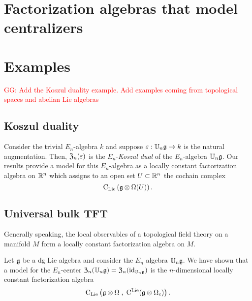 \documentclass[11pt]{amsart}
\numberwithin{equation}{section}
\def\greg{\textcolor{red}{GG: }\textcolor{red}}
\begin{document}
%

\section{Factorization algebras that model centralizers}


\section{Examples}


\greg{Add the Koszul duality example. Add examples coming from topological spaces and abelian Lie algebras}

\subsection{Koszul duality}
\label{sec: Koszul}

Consider the trivial $E_n$-algebra $k$ and suppose $\varepsilon : \mathbb U_n \mathfrak g \to k$ is the natural augmentation. 
Then, ${\frak Z}_n (\varepsilon)$ is the $E_n$-{\em Koszul dual} of the $E_n$-algebra $\mathbb U_n \mathfrak g$. 
Our results provide a model for this $E_n$-algebra as a locally constant factorization algebra on $\mathbb R^n$ which assigns to an open set $U \subset \mathbb R^n$ the cochain complex
\[
{\rm C}_{{\rm Lie}} \left(\mathfrak g \otimes \Omega(U) \right) .
\]

\subsection{Universal bulk TFT}
\label{sec: TFT}

Generally speaking, the local observables of a topological field theory on a manifold $M$ form a locally constant factorization algebra on $M$. 

Let $\mathfrak g$ be a dg Lie algebra and consider the $E_n$ algebra $\mathbb U_n \mathfrak g$. 
We have shown that a model for the $E_n$-center ${\frak Z}_n (\mathbb U_n \mathfrak g) = {\frak Z}_n ({\rm id}_{\mathbb U_n \mathfrak g})$ is the $n$-dimensional locally constant factorization algebra 
\[
{\rm C}_{{\rm Lie}} \left( \mathfrak g \otimes \Omega \; , \; {\rm C}^{\rm Lie} (\mathfrak g \otimes \Omega_c) \right)  .
\]
\end{document}
